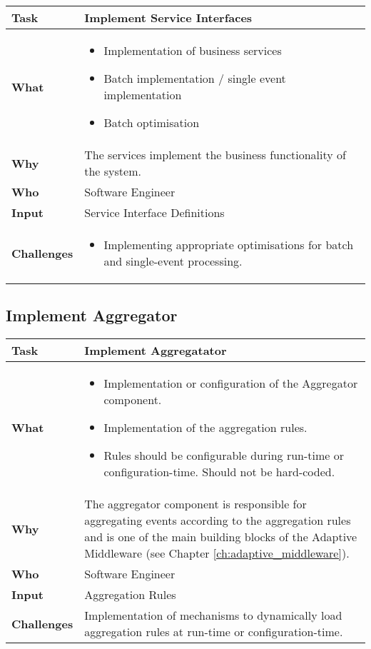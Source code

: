 \begin{tabularx}{\textwidth}{@{} l X @{}}
	\caption{Implement Service Interfaces} \label{table:ch6_Task_Implement_Service_Interfaces}\\
	\toprule 
	\bfseries Task & Implement Service Interfaces\\
	\midrule 
	\bfseries What & 
	\begin{itemize}
		\item Implementation of business services
		\item Batch implementation / single event implementation
		\item Batch optimisation
	\end{itemize}
	\\
	\midrule 
	\bfseries Why & The services implement the business functionality of the system.\\
	\midrule 
	\bfseries Who & Software Engineer\\
	\midrule 
	\bfseries Input & Service Interface Definitions\\
	\midrule 
	\bfseries Challenges & 
	\begin{itemize}
		\item Implementing appropriate optimisations for batch and single-event processing.
	\end{itemize}
	\\
	\bottomrule 
\end{tabularx}


\subsection{Implement Aggregator}
\begin{tabularx}{\textwidth}{@{} l X @{}}
	\caption{Implement Aggregator} \label{table:ch6_Task_Implement_Aggregator}\\
	\toprule 
	\bfseries Task & Implement Aggregatator\\
	\midrule 
	\bfseries What & 
	\begin{itemize}
		\item Implementation or configuration of the Aggregator component.
		\item Implementation of the aggregation rules.
		\item Rules should be configurable during run-time or configuration-time. Should not be hard-coded.
	\end{itemize}
	\\
	\midrule 
	\bfseries Why & The aggregator component is responsible for aggregating events according to the aggregation rules and is one of the main building blocks of the Adaptive Middleware (see Chapter \ref{ch:adaptive_middleware}).\\
	\midrule 
	\bfseries Who & Software Engineer\\
	\midrule 
	\bfseries Input & Aggregation Rules\\
	\midrule 
	\bfseries Challenges & Implementation of mechanisms to dynamically load aggregation rules at run-time or configuration-time.\\
	\bottomrule 
\end{tabularx}



